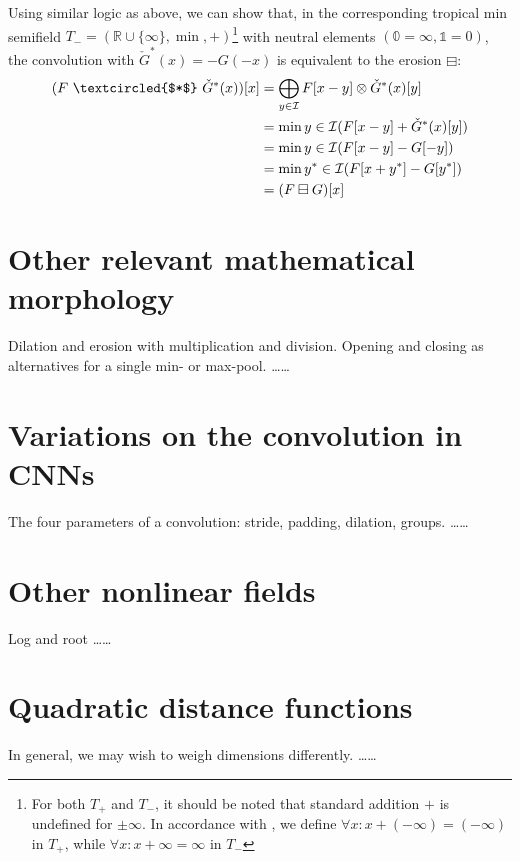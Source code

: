 \documentclass[a4paper, 12pt]{report}
\def\comment#1{\color{red}#1\color{black}}
\begin{document}
Using similar logic as above, we can show that, in the corresponding tropical min semifield $T_-=(\mathbb{R}\cup\{\infty\},\min,+)$\footnote{For both $T_+$ and $T_-$, it should be noted that standard addition $+$ is undefined for $\pm\infty$. In accordance with \cite{maragos}, we define $\forall x: x+(-\infty)=(-\infty)$ in $T_+$, while $\forall x: x+\infty=\infty$ in $T_-$} \cite{maragos} with neutral elements $(\mathbb{0}=\infty, \mathbb{1}=0)$, the convolution with $\check{G}^*(x)=-G(-x)$ is equivalent to the erosion $\boxminus$:
\begin{align}
	(F ~\textcircled{$*$}~ \check{G}^*(x))[x]
	&= \bigoplus_{y\in \mathcal{I}}F[x-y] \otimes \check{G}^*(x)[y] \\
	&= \min{y\in \mathcal{I}}(F[x-y] + \check{G}^*(x)[y]) \\
	&= \min{y\in \mathcal{I}}(F[x-y] - G[-y]) \\
	&= \min{y^*\in \mathcal{I}}(F[x+y^*] - G[y^*]) \\
	&= (F \boxminus G)[x]
\end{align}

\section{Other relevant mathematical morphology}
Dilation and erosion with multiplication and division. Opening and closing as alternatives for a single min- or max-pool. \cite{heijmans1996morphological} \comment{\ldots\ldots}
\section{Variations on the convolution in CNNs}
The four parameters of a convolution: stride, padding, dilation, groups. \comment{\ldots\ldots}
\section{Other nonlinear fields}
Log and root \cite{bellaardaxiomatic} \comment{\ldots\ldots}

\section{Quadratic distance functions}
In general, we may wish to weigh dimensions differently. \cite{Boomgaard1999NumericalSS} \comment{\ldots\ldots}

\newpage
\end{document}
